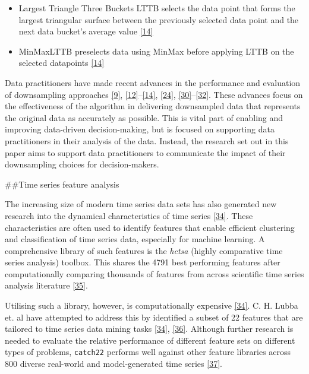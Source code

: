 \documentclass{article}
\providecommand{\tightlist}{%
  \setlength{\itemsep}{0pt}\setlength{\parskip}{0pt}}
\begin{document}
\begin{itemize}
\tightlist
\item
  Largest Triangle Three Buckets LTTB selects the data point that forms
  the largest triangular surface between the previously selected data
  point and the next data bucket's average value
  \protect\hyperlink{ref-MinMaxLTTB}{{[}14{]}}
\item
  MinMaxLTTB preselects data using MinMax before applying LTTB on the
  selected datapoints \protect\hyperlink{ref-MinMaxLTTB}{{[}14{]}}
\end{itemize}

Data practitioners have made recent advances in the performance and
evaluation of downsampling approaches
\protect\hyperlink{ref-datapoint}{{[}9{]}},
\protect\hyperlink{ref-downsampling}{{[}12{]}}--\protect\hyperlink{ref-MinMaxLTTB}{{[}14{]}},
\protect\hyperlink{ref-plotly}{{[}24{]}},
\protect\hyperlink{ref-dashql}{{[}30{]}}--\protect\hyperlink{ref-MinMaxOrdered}{{[}32{]}}.
These advances focus on the effectiveness of the algorithm in delivering
downsampled data that represents the original data as accurately as
possible. This is vital part of enabling and improving data-driven
decision-making, but is focused on supporting data practitioners in
their analysis of the data. Instead, the research set out in this paper
aims to support data practitioners to communicate the impact of their
downsampling choices for decision-makers.

\#\#Time series feature analysis

The increasing size of modern time series data sets has also generated
new research into the dynamical characteristics of time series
\protect\hyperlink{ref-catch22}{{[}34{]}}. These characteristics are
often used to identify features that enable efficient clustering and
classification of time series data, especially for machine learning. A
comprehensive library of such features is the \emph{hctsa} (highly
comparative time series analysis) toolbox. This shares the 4791 best
performing features after computationally comparing thousands of
features from across scientific time series analysis literature
\protect\hyperlink{ref-fulcher2017}{{[}35{]}}.

Utilising such a library, however, is computationally expensive
\protect\hyperlink{ref-catch22}{{[}34{]}}. C. H. Lubba et. al have
attempted to address this by identified a subset of 22 features that are
tailored to time series data mining tasks
\protect\hyperlink{ref-catch22}{{[}34{]}},
\protect\hyperlink{ref-bagnall}{{[}36{]}}. Although further research is
needed to evaluate the relative performance of different feature sets on
different types of problems, \texttt{catch22} performs well against
other feature libraries across 800 diverse real-world and
model-generated time series \protect\hyperlink{ref-henderson}{{[}37{]}}.
\end{document}

